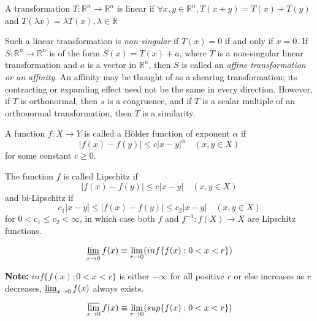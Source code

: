 \begin{definition}
    A transformation $T : \mathbb{R}^n \rightarrow \mathbb{R}^n$ is linear 
    if $\forall x, y \in \mathbb{R}^n, T(x+y) = T(x) + T(y)$ and 
    $T(\lambda x) = \lambda T(x), \lambda \in\mathbb{R}$ 
\end{definition}

Such a linear transformation is \textit{non-singular} if $T(x)=0$ if and only if $x=0 .$ If 
$S: \mathbb{R}^{n} \rightarrow \mathbb{R}^{n}$ is of the form $S(x)=T(x)+a$, 
where $T$ is a non-singular linear transformation and $a$ is a vector in 
$\mathbb{R}^{n}$, then $S$ is called an \textit{affine transformation}\textit{ or an 
affinity}. An affinity may be thought of as a shearing transformation; 
its contracting or expanding effect need not be the same in every direction. 
However, if $T$ is orthonormal, then $s$ is a congruence, and if $T$ is a 
scalar multiple of an orthonormal transformation, then $T$ is a similarity.

\begin{definition}
    A function $f: X \rightarrow Y$ is called a Hölder function of exponent $\alpha$ if
$$
|f(x)-f(y)| \leq c|x-y|^{\alpha} \quad(x, y \in X)
$$
    for some constant $c\geq 0$.
\end{definition}

\begin{definition}
    The function $f$ is called Lipschitz if
    $$
    |f(x)-f(y)| \leq c|x-y| \quad(x, y \in X)
    $$
    and bi-Lipschitz if 
    $$
    c_{1}|x-y| \leq |f(x)-f(y)| \leq c_{2}|x-y| \quad(x, y \in X)
    $$
    for $0<c_{1} \leq c_{2}<\infty$, in which case both $f$ and 
    $f^{-1}: f(X) \rightarrow X$ are Lipschitz functions.     
\end{definition}

\begin{definition}
    $$\displaystyle \operatorname*{\underline{lim}}_{x \to 0} f(x) \equiv \lim_{r\to 0}(inf\{f(x):0<x<r\})$$
\end{definition}

\textbf{Note:} $inf\{f(x):0<x<r\}$ is either $-\infty$ for all positive $r$ or else increases as $r$ decreases, 
$\operatorname*{\underline{lim}}_{x \to 0} f(x)$ always exists.

\begin{definition}
    $$\displaystyle \operatorname*{\overline{lim}}_{x \to 0} f(x) \equiv  \lim_{r\to 0}(sup\{f(x):0<x<r\})$$
\end{definition}

